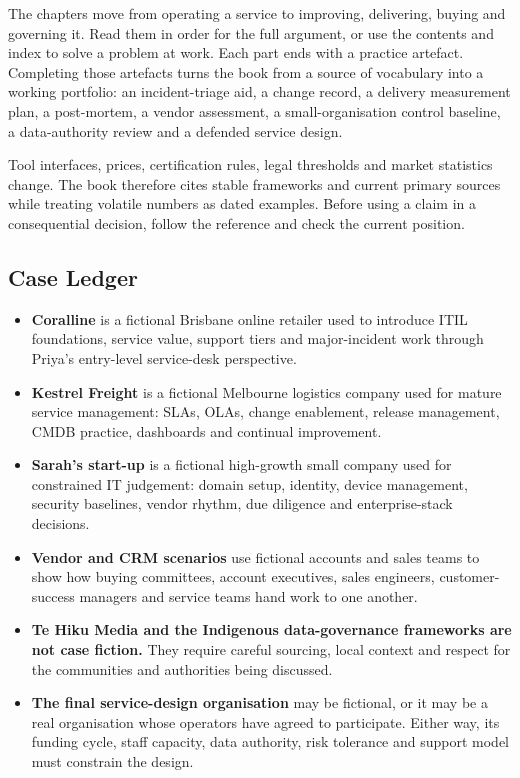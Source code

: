 \documentclass[11pt,openany]{book}
\begin{document}
The chapters move from operating a service to improving, delivering, buying and governing it. Read them in order for the full argument, or use the contents and index to solve a problem at work. Each part ends with a practice artefact. Completing those artefacts turns the book from a source of vocabulary into a working portfolio: an incident-triage aid, a change record, a delivery measurement plan, a post-mortem, a vendor assessment, a small-organisation control baseline, a data-authority review and a defended service design.


Tool interfaces, prices, certification rules, legal thresholds and market statistics change. The book therefore cites stable frameworks and current primary sources while treating volatile numbers as dated examples. Before using a claim in a consequential decision, follow the reference and check the current position.



\subsection{Case Ledger}


\begin{itemize}[leftmargin=*]
\item \textbf{Coralline} is a fictional Brisbane online retailer used to introduce ITIL foundations, service value, support tiers and major-incident work through Priya's entry-level service-desk perspective.
\item \textbf{Kestrel Freight} is a fictional Melbourne logistics company used for mature service management: SLAs, OLAs, change enablement, release management, CMDB practice, dashboards and continual improvement.
\item \textbf{Sarah's start-up} is a fictional high-growth small company used for constrained IT judgement: domain setup, identity, device management, security baselines, vendor rhythm, due diligence and enterprise-stack decisions.
\item \textbf{Vendor and CRM scenarios} use fictional accounts and sales teams to show how buying committees, account executives, sales engineers, customer-success managers and service teams hand work to one another.
\item \textbf{Te Hiku Media and the Indigenous data-governance frameworks are not case fiction.} They require careful sourcing, local context and respect for the communities and authorities being discussed.
\item \textbf{The final service-design organisation} may be fictional, or it may be a real organisation whose operators have agreed to participate. Either way, its funding cycle, staff capacity, data authority, risk tolerance and support model must constrain the design.
\end{itemize}
\end{document}
